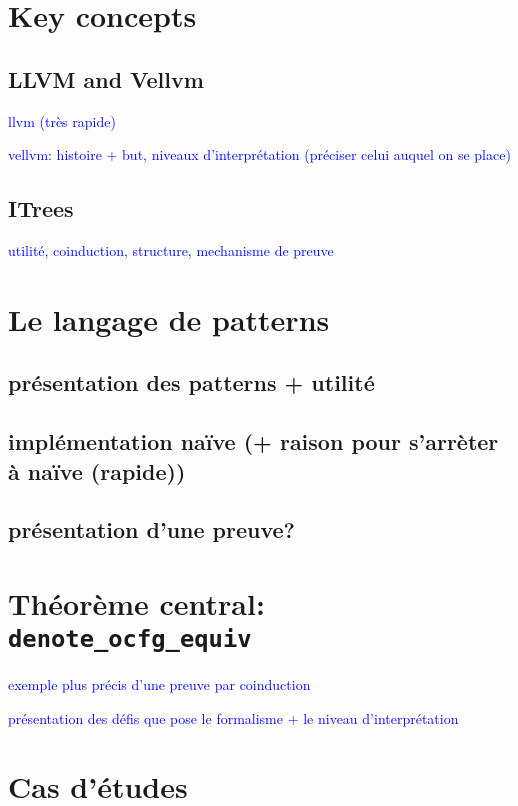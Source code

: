 \documentclass[11pt]{article}
\newcommand{\leon}[1]{\textcolor{blue}{#1}}
\begin{document}
\section{Key concepts}

\subsection{LLVM and Vellvm}

\leon{llvm (très rapide)}

\leon{vellvm: histoire + but, niveaux d'interprétation (préciser celui auquel on se place)}

\subsection{ITrees}

\leon{utilité, coinduction, structure, mechanisme de preuve}

\section{Le langage de patterns}

\subsection{présentation des patterns + utilité}

\subsection{implémentation naïve (+ raison pour s'arrèter à naïve (rapide))}

\subsection{présentation d'une preuve?}

\section{Théorème central: \texttt{denote\_ocfg\_equiv}}

\leon{exemple plus précis d'une preuve par coinduction}

\leon{présentation des défis que pose le formalisme + le niveau d'interprétation}

\section{Cas d'études}
\end{document}
